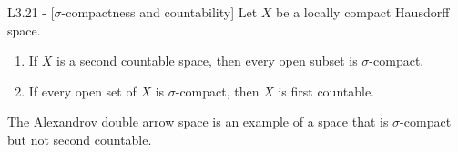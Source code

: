 \documentclass{article}
\begin{document}
\begin{flexilemma}{L3.21 - }[$\sigma$-compactness and countability]
    Let $X$ be a locally compact Hausdorff space.
    \begin{enumerate}[label=(\roman*)]
        \item If $X$ is a second countable space, then every open subset is $\sigma$-compact.
        \item If every open set of $X$ is $\sigma$-compact, then $X$ is first countable.
    \end{enumerate}
\end{flexilemma}

The Alexandrov double arrow space is an example of a space that is $\sigma$-compact but not second countable.





{}

\end{document}
